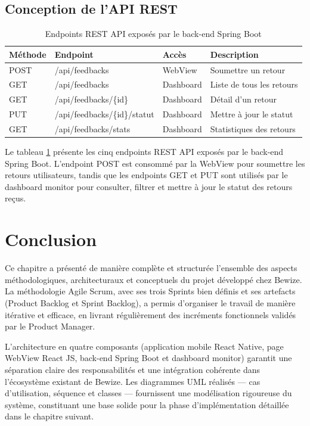 \subsection{Conception de l'API REST}

\begin{table}[H]
\centering
\caption{Endpoints REST API exposés par le back-end Spring Boot}
\label{tab:api}
\renewcommand{\arraystretch}{1.5}
\begin{tabular}{|p{1.8cm}|p{5cm}|p{2cm}|p{4cm}|}
\hline
\textbf{Méthode} & \textbf{Endpoint} & \textbf{Accès} & \textbf{Description} \\
\hline
POST & /api/feedbacks & WebView & Soumettre un retour \\
\hline
GET & /api/feedbacks & Dashboard & Liste de tous les retours \\
\hline
GET & /api/feedbacks/\{id\} & Dashboard & Détail d'un retour \\
\hline
PUT & /api/feedbacks/\{id\}/statut & Dashboard & Mettre à jour le statut \\
\hline
GET & /api/feedbacks/stats & Dashboard & Statistiques des retours \\
\hline
\end{tabular}
\end{table}

Le tableau \ref{tab:api} présente les cinq endpoints REST API exposés 
par le back-end Spring Boot. L'endpoint POST est consommé par la WebView 
pour soumettre les retours utilisateurs, tandis que les endpoints GET 
et PUT sont utilisés par le dashboard monitor pour consulter, filtrer 
et mettre à jour le statut des retours reçus.

\section{Conclusion}

Ce chapitre a présenté de manière complète et structurée l'ensemble 
des aspects méthodologiques, architecturaux et conceptuels du projet 
développé chez Bewize. La méthodologie Agile Scrum, avec ses trois 
Sprints bien définis et ses artefacts (Product Backlog et Sprint Backlog), 
a permis d'organiser le travail de manière itérative et efficace, en 
livrant régulièrement des incréments fonctionnels validés par le Product 
Manager.

L'architecture en quatre composants (application mobile React Native, 
page WebView React JS, back-end Spring Boot et dashboard monitor) garantit 
une séparation claire des responsabilités et une intégration cohérente 
dans l'écosystème existant de Bewize. Les diagrammes UML réalisés — 
cas d'utilisation, séquence et classes — fournissent une modélisation 
rigoureuse du système, constituant une base solide pour la phase 
d'implémentation détaillée dans le chapitre suivant.
